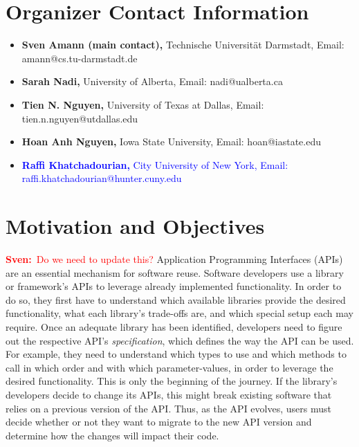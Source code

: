 \documentclass[10pt, conference]{IEEEtran}
\newcommand{\sa}[1]{{\textcolor{red}{\textbf{Sven:}~#1}}}
\newcommand{\updated}[1]{{\textcolor{blue}{#1}}}
\begin{document}
\section{Organizer Contact Information}
\begin{itemize}
\setlength\itemsep{5pt}
\item \textbf{Sven Amann (main contact),} Technische Universit\"{a}t Darmstadt, Email: amann@cs.tu-darmstadt.de
\item \textbf{Sarah Nadi,} University of Alberta, Email: nadi@ualberta.ca
\item \textbf{Tien N. Nguyen,} University of Texas at Dallas, Email: tien.n.nguyen@utdallas.edu
\item \textbf{Hoan Anh Nguyen,} Iowa State University, Email: hoan@iastate.edu
\item \updated{\textbf{Raffi Khatchadourian,} City University of New York, Email: raffi.khatchadourian@hunter.cuny.edu}
\end{itemize}

\section{Motivation and Objectives}
\sa{Do we need to update this?}
Application Programming Interfaces (APIs) are an essential mechanism for software reuse. Software developers use a library or framework's APIs to leverage already implemented functionality. In order to do so, they first have to understand which available libraries provide the desired functionality, what each library's trade-offs are, and which special setup each may require. Once an adequate library has been identified, developers need to figure out the respective API's \textit{specification}, which defines the way the API can be used. For example, they need to understand which types to use and which methods to call in which order and with which parameter-values, in order to leverage the desired functionality. This is only the beginning of the journey. If the library's developers decide to change its APIs, this might break existing software that relies on a previous version of the API. Thus, as the API evolves, users must decide whether or not they want to migrate to the new API version and determine how the changes will impact their code.
\end{document}
